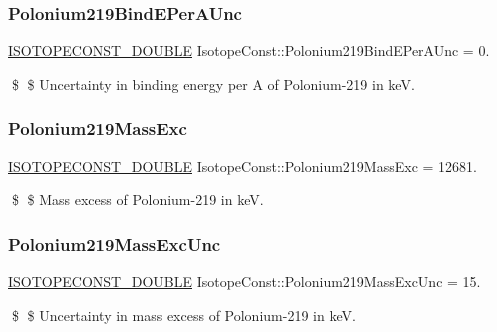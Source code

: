 \subsubsection{\texorpdfstring{Polonium219\+Bind\+E\+Per\+A\+Unc}{Polonium219BindEPerAUnc}}
{\footnotesize\ttfamily \mbox{\hyperlink{group___isotope_const-_macros_ga8f45a7272ce02c0b4c65c44636ed719a}{I\+S\+O\+T\+O\+P\+E\+C\+O\+N\+S\+T\+\_\+\+D\+O\+U\+B\+LE}} Isotope\+Const\+::\+Polonium219\+Bind\+E\+Per\+A\+Unc = 0.}

\$ \$ Uncertainty in binding energy per A of Polonium-\/219 in keV. \mbox{\label{group___isotope_const-_polonium-_po219_ga013fc8799809c2ba5270cdccb1bc1215}} 
\subsubsection{\texorpdfstring{Polonium219\+Mass\+Exc}{Polonium219MassExc}}
{\footnotesize\ttfamily \mbox{\hyperlink{group___isotope_const-_macros_ga8f45a7272ce02c0b4c65c44636ed719a}{I\+S\+O\+T\+O\+P\+E\+C\+O\+N\+S\+T\+\_\+\+D\+O\+U\+B\+LE}} Isotope\+Const\+::\+Polonium219\+Mass\+Exc = 12681.}

\$ \$ Mass excess of Polonium-\/219 in keV. \mbox{\label{group___isotope_const-_polonium-_po219_ga3f895a2d4b8686431db256e1c6288578}} 
\subsubsection{\texorpdfstring{Polonium219\+Mass\+Exc\+Unc}{Polonium219MassExcUnc}}
{\footnotesize\ttfamily \mbox{\hyperlink{group___isotope_const-_macros_ga8f45a7272ce02c0b4c65c44636ed719a}{I\+S\+O\+T\+O\+P\+E\+C\+O\+N\+S\+T\+\_\+\+D\+O\+U\+B\+LE}} Isotope\+Const\+::\+Polonium219\+Mass\+Exc\+Unc = 15.}

\$ \$ Uncertainty in mass excess of Polonium-\/219 in keV. \mbox{\label{group___isotope_const-_polonium-_po219_gaa10251789011e968f87fc8346edd14a5}} 
